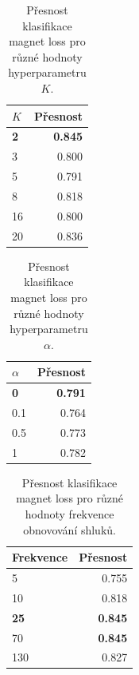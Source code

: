 \documentclass[10pt]{beamer}
\begin{document}
\begin{frame}
  \begin{table}
    \centering
    \begin{tabular}{lr}
      \toprule
      \( K \)    & Přesnost \\
      \midrule
      \textbf{2} & \textbf{0.845} \\
      3          & 0.800 \\
      5          & 0.791 \\
      8          & 0.818 \\
      16         & 0.800 \\
      20         & 0.836 \\
      \bottomrule
    \end{tabular}
    \caption{Přesnost klasifikace magnet loss pro různé hodnoty hyperparametru \( K \).}
  \end{table}
\end{frame}

\begin{frame}
  \begin{table}
    \centering
    \begin{tabular}{lr}
      \toprule
      \( \alpha \) & Přesnost \\
      \midrule
      \textbf{0}   & \textbf{0.791} \\
      0.1          & 0.764 \\
      0.5          & 0.773 \\
      1            & 0.782 \\
      \bottomrule
    \end{tabular}
    \caption{Přesnost klasifikace magnet loss pro různé hodnoty hyperparametru \( \alpha \).}
  \end{table}
\end{frame}

\begin{frame}
  \begin{table}
    \centering
    \begin{tabular}{lr}
      \toprule
      Frekvence   & Přesnost \\
      \midrule
      5           & 0.755 \\
      10          & 0.818 \\
      \textbf{25} & \textbf{0.845} \\
      70          & \textbf{0.845} \\
      130         & 0.827 \\
      \bottomrule
    \end{tabular}
    \caption{Přesnost klasifikace magnet loss pro různé hodnoty frekvence obnovování shluků.}
  \end{table}
\end{frame}
\end{document}
